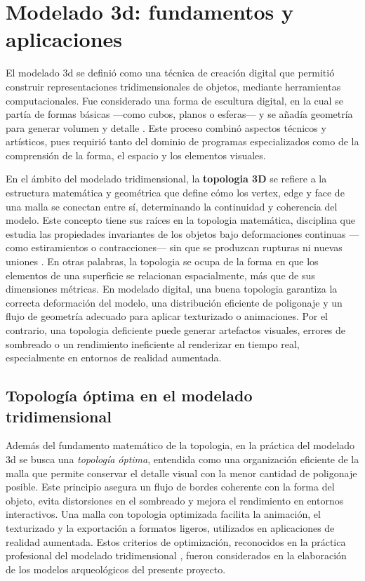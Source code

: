 
\section*{Modelado \gls{3d}: fundamentos y aplicaciones}

El modelado \gls{3d} se definió como una técnica de creación digital que permitió construir representaciones tridimensionales de objetos, mediante herramientas computacionales. Fue considerado una forma de escultura digital, en la cual se partía de formas básicas —como cubos, planos o esferas— y se añadía geometría para generar volumen y detalle \cite{Teijeiro2023}. Este proceso combinó aspectos técnicos y artísticos, pues requirió tanto del dominio de programas especializados como de la comprensión de la forma, el espacio y los elementos visuales.

En el ámbito del modelado tridimensional, la \textbf{\gls{topologia} 3D} se refiere a la estructura matemática y geométrica que define cómo los \gls{vertex}, \gls{edge} y \gls{face} de una \gls{malla} se conectan entre sí, determinando la continuidad y coherencia del modelo. Este concepto tiene sus raíces en la \gls{topologia} matemática, disciplina que estudia las propiedades invariantes de los objetos bajo deformaciones continuas —como estiramientos o contracciones— sin que se produzcan rupturas ni nuevas uniones \cite{Macho2002}. En otras palabras, la \gls{topologia} se ocupa de la forma en que los elementos de una superficie se relacionan espacialmente, más que de sus dimensiones métricas. En modelado digital, una buena \gls{topologia} garantiza la correcta deformación del modelo, una distribución eficiente de \gls{poligonaje} y un flujo de geometría adecuado para aplicar \gls{texturizado} o animaciones. Por el contrario, una \gls{topologia} deficiente puede generar artefactos visuales, errores de sombreado o un rendimiento ineficiente al renderizar en tiempo real, especialmente en entornos de realidad aumentada.

\subsection*{Topología óptima en el modelado tridimensional}

Además del fundamento matemático de la \gls{topologia}, en la práctica del modelado \gls{3d} se busca una \textit{topología óptima}, entendida como una organización eficiente de la \gls{malla} que permite conservar el detalle visual con la menor cantidad de \gls{poligonaje} posible. Este principio asegura un flujo de bordes coherente con la forma del objeto, evita distorsiones en el sombreado y mejora el rendimiento en entornos interactivos. Una \gls{malla} con \gls{topologia} optimizada facilita la animación, el \gls{texturizado} y la exportación a formatos ligeros, utilizados en aplicaciones de realidad aumentada. Estos criterios de optimización, reconocidos en la práctica profesional del modelado tridimensional \cite{Linkedin2025}, fueron considerados en la elaboración de los modelos arqueológicos del presente proyecto.


